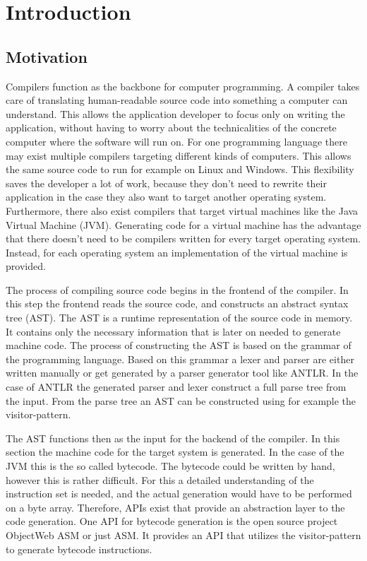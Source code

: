 \chapter{Introduction}
\label{cha:introduction}

\section{Motivation}

Compilers function as the backbone for computer programming. A compiler takes care of translating human-readable source code into something a computer can understand. This allows the application developer to focus only on writing the application, without having to worry about the technicalities of the concrete computer where the software will run on. For one programming language there may exist multiple compilers targeting different kinds of computers. This allows the same source code to run for example on Linux and Windows. This flexibility saves the developer a lot of work, because they don't need to rewrite their application in the case they also want to target another operating system. Furthermore, there also exist compilers that target virtual machines like the Java Virtual Machine (JVM). Generating code for a virtual machine has the advantage that there doesn't need to be compilers written for every target operating system. Instead, for each operating system an implementation of the virtual machine is provided.

The process of compiling source code begins in the frontend of the compiler. In this step the frontend reads the source code, and constructs an abstract syntax tree (AST). The AST is a runtime representation of the source code in memory. It contains only the necessary information that is later on needed to generate machine code. The process of constructing the AST is based on the grammar of the programming language. Based on this grammar a lexer and parser are either written manually or get generated by a parser generator tool like ANTLR. In the case of ANTLR the generated parser and lexer construct a full parse tree from the input. From the parse tree an AST can be constructed using for example the visitor-pattern. 

The AST functions then as the input for the backend of the compiler. In this section the machine code for the target system is generated. In the case of the JVM this is the so called bytecode. The bytecode could be written by hand, however this is rather difficult. For this a detailed understanding of the instruction set is needed, and the actual generation would have to be performed on a byte array. Therefore, APIs exist that provide an abstraction layer to the code generation. One API for bytecode generation is the open source project ObjectWeb ASM or just ASM. It provides an API that utilizes the visitor-pattern to generate bytecode instructions. 


